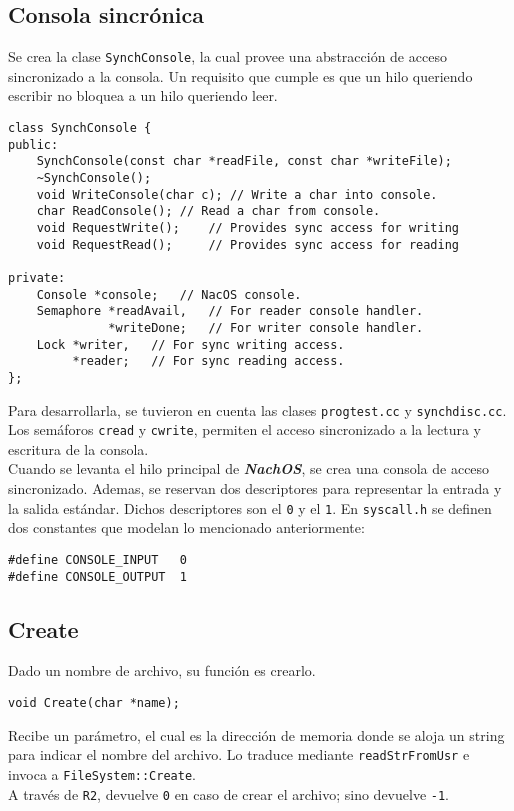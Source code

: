 \subsection*{Consola sincrónica}
Se crea la clase \texttt{SynchConsole}, la cual provee una abstracción de acceso sincronizado a la consola. Un requisito que cumple es que un hilo queriendo escribir no bloquea a un hilo queriendo leer.
\begin{lstlisting}[style=C]
class SynchConsole {
public:
	SynchConsole(const char *readFile, const char *writeFile);
	~SynchConsole();
    void WriteConsole(char c); // Write a char into console.
    char ReadConsole(); // Read a char from console.
    void RequestWrite();    // Provides sync access for writing
    void RequestRead();     // Provides sync access for reading

private: 
    Console *console;   // NacOS console.
    Semaphore *readAvail,   // For reader console handler.
              *writeDone;   // For writer console handler.
    Lock *writer,   // For sync writing access.
         *reader;   // For sync reading access.
};
\end{lstlisting}
Para desarrollarla, se tuvieron en cuenta las clases \texttt{progtest.cc} y \texttt{synchdisc.cc}.\\
Los semáforos \texttt{cread} y \texttt{cwrite}, permiten el acceso sincronizado a la lectura y escritura de la consola.\\
Cuando se levanta el hilo principal de \textbf{\textit{NachOS}}, se crea una consola de acceso sincronizado. Ademas, se reservan dos descriptores para representar la entrada y la salida estándar. Dichos descriptores son el \texttt{0} y el \texttt{1}. En \texttt{syscall.h} se definen dos constantes que modelan lo mencionado anteriormente:
\begin{lstlisting}
#define CONSOLE_INPUT	0
#define CONSOLE_OUTPUT	1
\end{lstlisting}
\subsection*{Create}
Dado un nombre de archivo, su función es crearlo.
\begin{lstlisting}[style=C]
void Create(char *name);
\end{lstlisting}
Recibe un parámetro, el cual es la dirección de memoria donde se aloja un string para indicar el nombre del archivo. Lo traduce mediante \texttt{readStrFromUsr} e invoca a \texttt{FileSystem::Create}.\\
A través de \texttt{R2}, devuelve \texttt{0} en caso de crear el archivo; sino devuelve \texttt{-1}.
